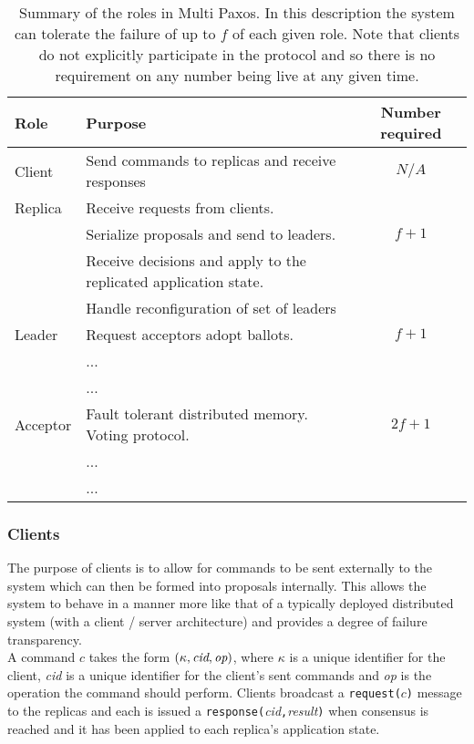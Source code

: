\begin{table}
\centering
\begin{tabular}{ l | p{8cm} | c }
   Role & Purpose & Number required \\ \hline \hline
   Client & Send commands to replicas and receive responses & $ N/A $ \\ \hline
  
   Replica & Receive requests from clients. &  \\
                 & Serialize proposals and send to leaders. & $f + 1$ \\
                 & Receive decisions and apply to the replicated application state. & \\
                 & Handle reconfiguration of set of leaders & \\ \hline
  
  Leader & Request acceptors adopt ballots. & $f + 1$ \\
               & ... & \\
               & ... &  \\ \hline
               
  Acceptor & Fault tolerant distributed memory. Voting protocol. & $2f + 1$ \\
                   & ... & \\
                   & ... &  \\ \hline
\end{tabular}
\caption{Summary of the roles in Multi Paxos. In this description the system can tolerate the failure of up to $f$ of each given role. Note that clients do not explicitly participate in the protocol and so there is no requirement on any number being live at any given time.}
\label{table:multi-role-summary}
\end{table}


\subsubsection{Clients}

The purpose of clients is to allow for commands to be sent externally to the system which can then be formed into proposals internally. This allows the system to behave in a manner more like that of a typically deployed distributed system (with a client / server architecture) and provides a degree of failure transparency. \\

A command $c$ takes the form $\left( \kappa, \mathrm{\emph{cid}}, \mathrm{\emph{op}} \right)$, where $\kappa$ is a unique identifier for the client, \emph{cid} is a unique identifier for the client's sent commands and \emph{op} is the operation the command should perform. Clients broadcast a \texttt{request($c$)} message to the replicas and each is issued a \texttt{response(}\emph{cid}\texttt{,}\emph{result}\texttt{)} when consensus is reached and it has been applied to each replica's application state.


